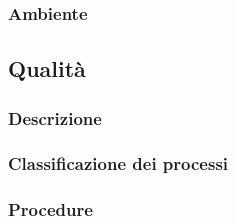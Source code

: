 \subsubsection{Ambiente}

\subsection{Qualità}

\subsubsection{Descrizione}

\subsubsection{Classificazione dei processi}

\subsubsection{Procedure}


